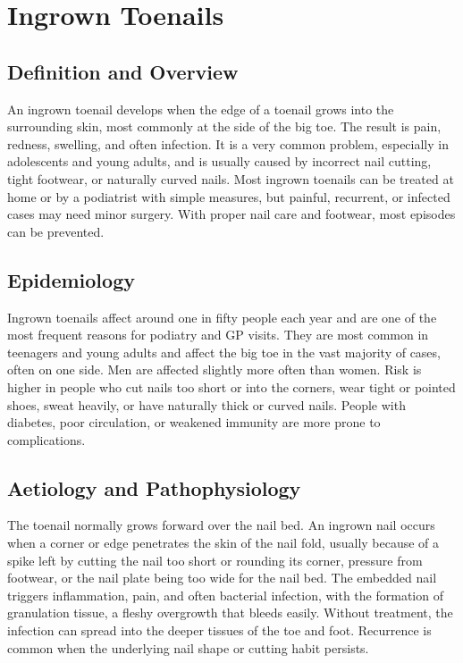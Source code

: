 \chapter{Ingrown Toenails}

\section*{Definition and Overview}
An ingrown toenail develops when the edge of a toenail grows into the surrounding skin, most commonly at the side of the big toe. The result is pain, redness, swelling, and often infection. It is a very common problem, especially in adolescents and young adults, and is usually caused by incorrect nail cutting, tight footwear, or naturally curved nails. Most ingrown toenails can be treated at home or by a podiatrist with simple measures, but painful, recurrent, or infected cases may need minor surgery. With proper nail care and footwear, most episodes can be prevented.

\section*{Epidemiology}
Ingrown toenails affect around one in fifty people each year and are one of the most frequent reasons for podiatry and GP visits. They are most common in teenagers and young adults and affect the big toe in the vast majority of cases, often on one side. Men are affected slightly more often than women. Risk is higher in people who cut nails too short or into the corners, wear tight or pointed shoes, sweat heavily, or have naturally thick or curved nails. People with diabetes, poor circulation, or weakened immunity are more prone to complications.

\section*{Aetiology and Pathophysiology}
The toenail normally grows forward over the nail bed. An ingrown nail occurs when a corner or edge penetrates the skin of the nail fold, usually because of a spike left by cutting the nail too short or rounding its corner, pressure from footwear, or the nail plate being too wide for the nail bed. The embedded nail triggers inflammation, pain, and often bacterial infection, with the formation of granulation tissue, a fleshy overgrowth that bleeds easily. Without treatment, the infection can spread into the deeper tissues of the toe and foot. Recurrence is common when the underlying nail shape or cutting habit persists.

